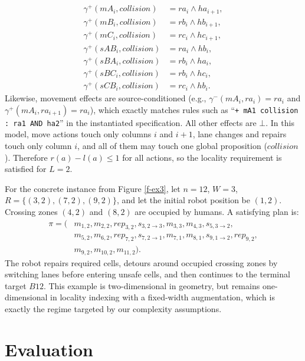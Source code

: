 \documentclass[a4paper,fleqn]{cas-dc}
\begin{document}
\begin{equation}
\begin{aligned}
\gamma^+(mA_i,collision)&=ra_i\land ha_{i+1},\\
\gamma^+(mB_i,collision)&=rb_i\land hb_{i+1},\\
\gamma^+(mC_i,collision)&=rc_i\land hc_{i+1},\\
\gamma^+(sAB_i,collision)&=ra_i\land hb_i,\\
\gamma^+(sBA_i,collision)&=rb_i\land ha_i,\\
\gamma^+(sBC_i,collision)&=rb_i\land hc_i,\\
\gamma^+(sCB_i,collision)&=rc_i\land hb_i.
\end{aligned}
\end{equation}
Likewise, movement effects are source-conditioned (e.g., $\gamma^-(mA_i,ra_i)=ra_i$ and $\gamma^+(mA_i,ra_{i+1})=ra_i$), which exactly matches rules such as ``\texttt{+ mA1 collision : ra1 AND ha2}'' in the instantiated specification.
All other effects are $\bot$. In this model, move actions touch only columns $i$ and $i+1$, lane changes and repairs touch only column $i$, and all of them may touch one global proposition ($collision$). Therefore $r(a)-l(a)\le 1$ for all actions, so the locality requirement is satisfied for $L=2$.

For the concrete instance from Figure \ref{f-ex3}, let $n=12$, $W=3$, $R=\{(3,2),(7,2),(9,2)\}$, and let the initial robot position be $(1,2)$.
Crossing zones $(4,2)$ and $(8,2)$ are occupied by humans.
A satisfying plan is:
\begin{equation*}
\begin{split}
\pi = (&m_{1,2}, m_{2,2}, rep_{3,2}, s_{3,2\to 3}, m_{3,3}, m_{4,3}, s_{5,3\to 2},\\
      &m_{5,2}, m_{6,2}, rep_{7,2}, s_{7,2\to 1}, m_{7,1}, m_{8,1}, s_{9,1\to 2}, rep_{9,2},\\
      &m_{9,2}, m_{10,2}, m_{11,2}).
\end{split}
\end{equation*}
The robot repairs required cells, detours around occupied crossing zones by switching lanes before entering unsafe cells, and then continues to the terminal target $B12$.
This example is two-dimensional in geometry, but remains one-dimensional in locality indexing with a fixed-width augmentation, which is exactly the regime targeted by our complexity assumptions.


\section{Evaluation}\label{eval}
\end{document}
